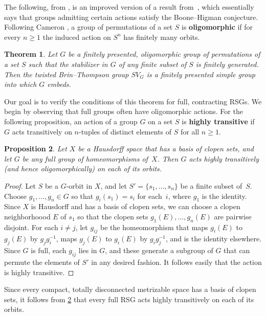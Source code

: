 \documentclass[11pt,letterpaper]{amsart}
\newtheorem{theorem}{Theorem}[section]
\newtheorem{proposition}[theorem]{Proposition}
\theoremstyle{definition}
\newcommand{\newword}[1]{\textbf{#1}}
\begin{document}
The following, from \cite{zaremskyTaste}, is an improved version of a result from~\cite{BelkZaremskyTwisted}, which essentially says that groups admitting certain actions satisfy the Boone--Higman conjecture. Following Cameron \cite{Cameron}, a group of permutations of a set $S$ is \newword{oligomorphic} if for every $n\ge 1$ the induced action on $S^n$ has finitely many orbits.

\begin{theorem}\label{thrm:action_to_simple}\cite[Theorem~4.2]{zaremskyTaste}
Let $G$ be a finitely presented, oligomorphic group of permutations of a set $S$ such that the stabilizer in $G$ of any finite subset of $S$ is finitely generated. Then the twisted Brin--Thompson group $SV_G$ is a finitely presented simple group into which $G$ embeds.
\end{theorem}

Our goal is to verify the conditions of this theorem for full, contracting RSGs. We begin by observing that full groups often have oligomorphic actions. For the following proposition, an action of a group $G$ on a set $S$ is \newword{highly transitive} if $G$ acts transitively on $n$-tuples of distinct elements of $S$ for all $n\geq 1$.

\begin{proposition}\label{prop:HighlyTransitiveAction}
Let $X$ be a Hausdorff space that has a basis of clopen sets, and let $G$ be any full group of homeomorphisms of~$X$.  Then $G$ acts highly transitively (and hence oligomorphically) on each of its orbits.
\end{proposition}
\begin{proof}
Let $S$ be a $G$-orbit in $X$, and let $S'=\{s_1,\ldots,s_n\}$ be a finite subset of~$S$.   Choose $g_1,\ldots,g_n\in G$ so that $g_i(s_1)=s_i$ for each~$i$, where $g_1$ is the identity.  Since $X$ is Hausdorff and has a basis of clopen sets, we can choose a clopen neighborhoood $E$ of $s_1$ so that the clopen sets $g_1(E),\ldots,g_n(E)$ are pairwise disjoint.  For each $i\ne j$, let $g_{ij}$ be the homeomorphism that maps $g_i(E)$ to $g_j(E)$ by $g_jg_i^{-1}$, maps $g_j(E)$ to $g_i(E)$ by $g_ig_j^{-1}$, and is the identity elsewhere.  Since $G$ is full, each $g_{ij}$ lies in $G$, and these generate a subgroup of $G$ that can permute the elements of $S'$ in any desired fashion.  It follows easily that the action is highly transitive.
\end{proof}

Since every compact, totally disconnected metrizable space has a basis of clopen sets, it follows from \cref{prop:HighlyTransitiveAction} that every full RSG acts highly transitively on each of its orbits.
\end{document}
